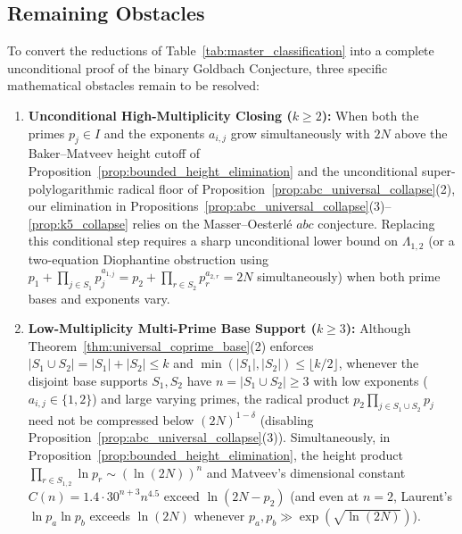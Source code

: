 \documentclass[11pt,a4paper]{article}
\theoremstyle{definition}
\begin{document}
\subsection{Remaining Obstacles}
\label{subsec:remaining_obstacles}

To convert the reductions of Table~\ref{tab:master_classification} into a complete unconditional proof of the binary Goldbach Conjecture, three specific mathematical obstacles remain to be resolved:

\begin{enumerate}
    \item \textbf{Unconditional High-Multiplicity Closing ($k \ge 2$):}  
    When both the primes $p_j \in I$ and the exponents $a_{i,j}$ grow simultaneously with $2N$ above the Baker--Matveev height cutoff of Proposition~\ref{prop:bounded_height_elimination} and the unconditional super-polylogarithmic radical floor of Proposition~\ref{prop:abc_universal_collapse}(2), our elimination in Propositions~\ref{prop:abc_universal_collapse}(3)--\ref{prop:k5_collapse} relies on the Masser--Oesterl\'e $abc$ conjecture. Replacing this conditional step requires a sharp unconditional lower bound on $\Lambda_{1,2}$ (or a two-equation Diophantine obstruction using $p_1 + \prod_{j \in S_1} p_j^{a_{1,j}} = p_2 + \prod_{r \in S_2} p_r^{a_{2,r}} = 2N$ simultaneously) when both prime bases and exponents vary.

    \item \textbf{Low-Multiplicity Multi-Prime Base Support ($k \ge 3$):}  
    Although Theorem~\ref{thm:universal_coprime_base}(2) enforces $|S_1 \cup S_2| = |S_1| + |S_2| \le k$ and $\min(|S_1|, |S_2|) \le \lfloor k/2 \rfloor$, whenever the disjoint base supports $S_1, S_2$ have $n = |S_1 \cup S_2| \ge 3$ with low exponents ($a_{i,j} \in \{1, 2\}$) and large varying primes, the radical product $p_2 \prod_{j \in S_1 \cup S_2} p_j$ need not be compressed below $(2N)^{1-\delta}$ (disabling Proposition~\ref{prop:abc_universal_collapse}(3)). Simultaneously, in Proposition~\ref{prop:bounded_height_elimination}, the height product $\prod_{r \in S_{1,2}} \ln p_r \sim (\ln(2N))^n$ and Matveev's dimensional constant $C(n) = 1.4 \cdot 30^{n+3} n^{4.5}$ exceed $\ln(2N - p_2)$ (and even at $n = 2$, Laurent's $\ln p_a \ln p_b$ exceeds $\ln(2N)$ whenever $p_a, p_b \gg \exp(\sqrt{\ln(2N)})$).


\end{enumerate}
\end{document}
